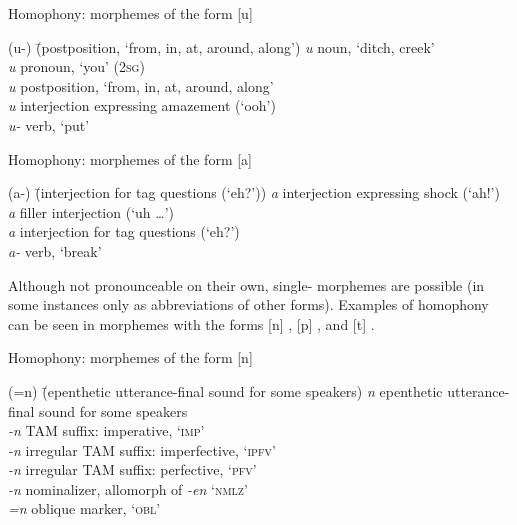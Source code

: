 \ea%
    \label{ex:sem:1b}
            Homophony: morphemes of the form [u]
\begin{tabbing}
{(u-)} \= {(postposition, ‘from, in, at, around, along’)}\kill
{\textit{u}} \> {noun, ‘ditch, creek’}\\
{\textit{u}} \> {pronoun, ‘you’ (\textsc{2sg})}\\
{\textit{u}} \> {postposition, ‘from, in, at, around, along’}\\
{\textit{u}} \> {interjection expressing amazement (‘ooh’)}\\
{\textit{u-}} \> {verb, ‘put’}
\end{tabbing}
\z

\ea%
    \label{ex:sem:1c}
            Homophony: morphemes of the form [a]
\begin{tabbing}
{(a-)} \= {(interjection for tag questions (‘eh?’))}\kill
{\textit{a}} \> {interjection expressing shock (‘ah!’)}\\
{\textit{a}} \> {filler interjection (‘uh …’)}\\
{\textit{a}} \> {interjection for tag questions (‘eh?’)}\\
{\textit{a-}} \> {verb, ‘break’}
\end{tabbing}
\z

Although not pronounceable on their own, single- morphemes are possible (in some instances only as abbreviations of other forms). Examples of homophony can be seen in morphemes with the forms [n] , [p] , and [t] .

\ea%
    \label{ex:sem:2a}
            Homophony: morphemes of the form [n]
\begin{tabbing}
{(=n)} \= {(epenthetic utterance-final sound for some speakers)}\kill
{\textit{n}} \> {epenthetic utterance-final sound for some speakers}\\
{\textit{-n}} \> {TAM suffix: imperative, ‘\textsc{imp}’}\\
{\textit{-n}} \> {irregular TAM suffix: imperfective, ‘\textsc{ipfv}’}\\
{\textit{-n}} \> {irregular TAM suffix: perfective, ‘\textsc{pfv}’}\\
{\textit{-n}} \> {nominalizer, allomorph of \textit{-en} ‘\textsc{nmlz’}}\\
{\textit{=n}} \> {oblique marker, ‘\textsc{obl}’}
\end{tabbing}
\z

